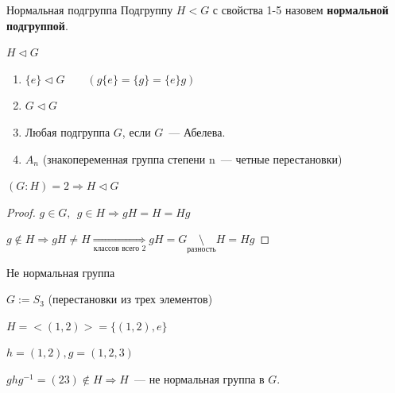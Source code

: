 \begin{Definition}{Нормальная подгруппа}{}
    Подгруппу $H < G$ с свойства 1-5 назовем \textbf{нормальной подгруппой}.

    $H \vartriangleleft G$
\end{Definition}

\begin{Example}{}{}
    \begin{enumerate}
        \item $\{e\} \vartriangleleft G \qquad (g\{e\} = \{g\} = \{e\}g)$
        \item $G \vartriangleleft G$
        \item Любая подгруппа $G$, если $G$~--- Абелева.
        \item $A_n$ (знакопеременная группа степени n~--- четные перестановки)
    \end{enumerate}
\end{Example}

\begin{Lemma}{}{}
    $(G:H) = 2 \Rightarrow H \vartriangleleft G$
\end{Lemma}

\begin{proof}

    $g \in G, \ \ g \in H \Rightarrow gH = H = Hg$

    $g \not \in H \Rightarrow gH \not = H \underset{\text{классов всего 2}}{\Rightarrow} gH = G \underset{\text{разность}}{\setminus} H = Hg$
\end{proof}

\begin{Example}{Не нормальная группа}{}

    $G := S_3$ (перестановки из трех элементов)

    $H = <(1, 2)> = \{(1,2),e\}$

    $h = (1, 2), g = (1, 2, 3)$

    $ghg^{-1} = (23) \not \in H \Rightarrow H$~--- не нормальная группа в $G$.

\end{Example}
